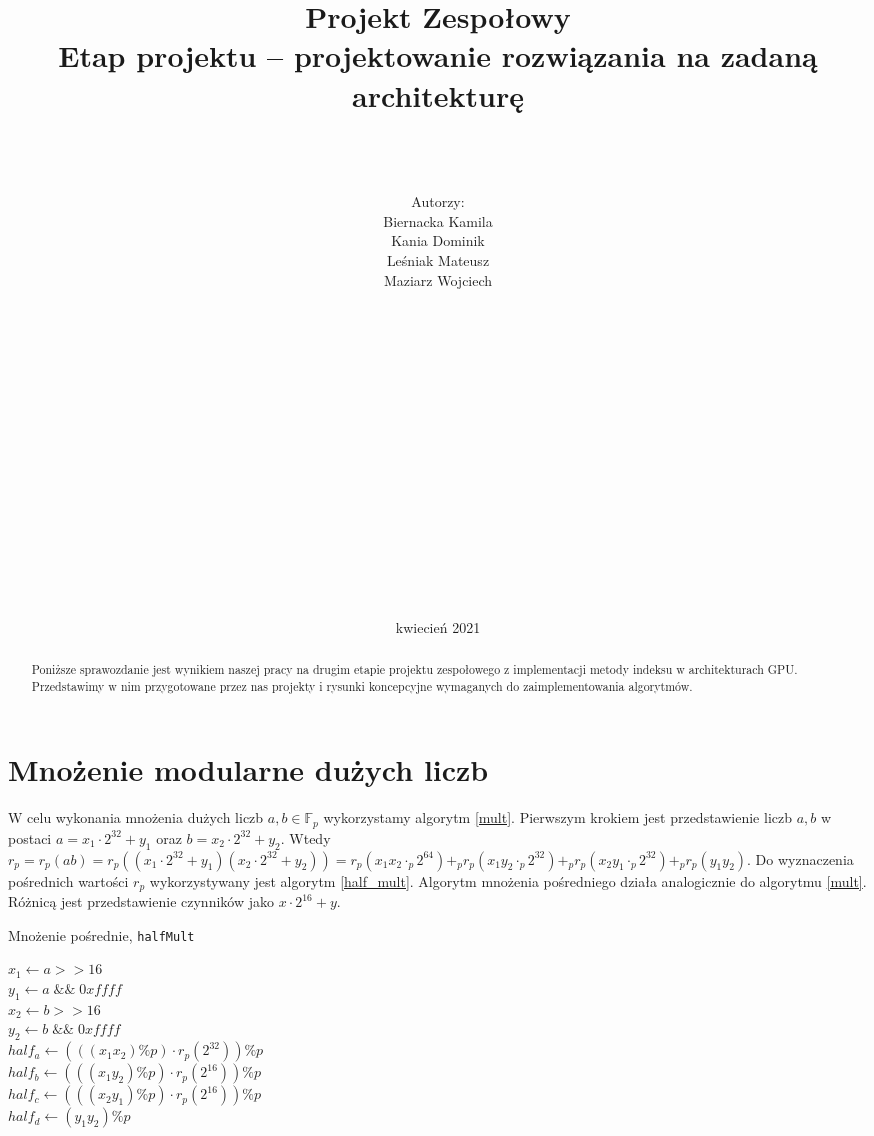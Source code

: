 \documentclass[]{article}
\title{Projekt Zespołowy \\
	\Huge Etap projektu – projektowanie rozwiązania na zadaną architekturę}
\author{\\ \\ \\ Autorzy:
	\\Biernacka Kamila\\ 
	Kania Dominik\\ 
	Leśniak Mateusz\\ 
	Maziarz Wojciech\\ \\ \\ \\ \\ \\ \\ \\ \\ \\ \\ \\ \\ \\ \\ \\ \\  }
\date{kwiecień 2021}
\begin{document}
\maketitle
\newpage



\begin{abstract}

Poniższe sprawozdanie jest wynikiem naszej pracy na drugim etapie projektu zespołowego z implementacji metody indeksu w architekturach GPU. Przedstawimy w nim przygotowane przez nas projekty i rysunki koncepcyjne wymaganych do zaimplementowania algorytmów.

\tableofcontents
\newpage

\end{abstract}

\section{Mnożenie modularne dużych liczb}
	W celu wykonania mnożenia dużych liczb \(a, b \in \mathbb{F}_p\) wykorzystamy algorytm \ref{mult}.
	Pierwszym krokiem jest przedstawienie liczb \(a, b\) w postaci \(a = x_1 \cdot 2^{32} + y_1\) oraz 
	\(b = x_2 \cdot 2^{32} + y_2\).
	\newline
	Wtedy
	\newline
	\(r_p = r_p(ab) = r_p((x_1 \cdot 2^{32} + y_1)(x_2 \cdot 2^{32} + y_2)) = r_p(x_1x_2 \cdot_p 2^{64}) +_p r_p(x_1y_2 \cdot_p 2^{32}) +_p r_p(x_2y_1 \cdot_p 2^{32}) +_p r_p(y_1y_2)\).
	\newline 
	Do wyznaczenia pośrednich wartości \(r_p\) wykorzystywany jest algorytm \ref{half_mult}. Algorytm mnożenia pośredniego działa analogicznie do algorytmu \ref{mult}. Różnicą jest przedstawienie czynników jako \(x \cdot 2^{16} + y\).
	
	
	\begin{algorithm}
		\SetAlgoLined
		\caption{Mnożenie pośrednie, \texttt{halfMult}}
		\label{half_mult}
		\(x_1 \gets a >> 16\)\\
		\(y_1 \gets a \; \&\& \; 0xffff \) \\
		\(x_2 \gets b >> 16\)\\
		\(y_2 \gets b \; \&\& \; 0xffff \) \\
		\(half_a \gets (((x_1 x_2) \% p) \cdot r_p(2^{32})) \%p\) \\
		\(half_b \gets (((x_1 y_2) \% p) \cdot r_p(2^{16})) \%p\) \\
		\(half_c \gets (((x_2 y_1) \% p) \cdot r_p(2^{16})) \%p\) \\
		\(half_d \gets (y_1 y_2) \%p\) \\
	\end{algorithm}
	
\end{document}

